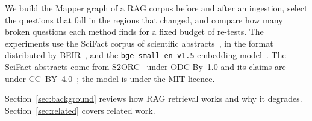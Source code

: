 We build the Mapper graph of a RAG corpus before and after an ingestion,
select the questions that fall in the regions that changed, and compare
how many broken questions each method finds for a fixed budget of
re-tests. The experiments use the SciFact corpus of scientific
abstracts~\cite{wadden2020scifact}, in the format distributed by
BEIR~\cite{thakur2021beir}, and the \texttt{bge-small-en-v1.5} embedding
model~\cite{xiao2024cpack, bge2023small}. The SciFact abstracts come from
S2ORC~\cite{lo2020s2orc} under ODC-By~1.0 and its claims are under
CC~BY~4.0~\cite{scifact2020licence}; the model is under the MIT licence.

Section~\ref{sec:background} reviews how RAG retrieval works and why it
degrades. Section~\ref{sec:related} covers related work.
